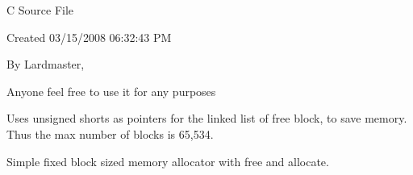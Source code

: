C Source File \par
 Created 03/15/2008 06:32:43 PM\par
 \par
 By Lardmaster,\par
 Anyone feel free to use it for any purposes\par
 \par
 Uses unsigned shorts as pointers for the linked list of free block, to save memory. Thus the max number of blocks is 65,534.\par
 Simple fixed block sized memory allocator with free and allocate. 